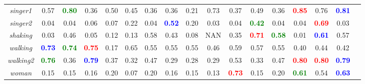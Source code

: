 \documentclass[preprint,12pt,review]{elsarticle}
\begin{document}
\begin{table*}[htp]
{\begin{tabular}{|c|c|c|c|c|c|c|c|c|c|c|c|c|c|c|c|c|}
%
\emph{singer1}   &0.57   &\textcolor{green}{\textbf{0.80}}  &0.36 &0.50  &0.45 &0.36 &0.36 &0.21 &0.73 &0.37 &0.49  &0.36  &\textcolor{red}{\textbf{0.85}}  &0.76 &\textcolor{blue}{\textbf{0.81}} \\
%
\emph{singer2}   &0.04  &0.04  &0.06  &0.07  &0.22 &0.04  &\textcolor{blue}{\textbf{0.52}}  &0.20  &0.03 &0.04 &\textcolor{green}{\textbf{0.42 }} &0.04  &0.04  &\textcolor{red}{\textbf{0.69}}  &0.03\\
%
\emph{shaking}   &0.03   &0.46  &0.05 &0.12  &0.13 &0.58  &0.43 &0.08  &NAN   &0.35   &\textcolor{red}{\textbf{0.71}}  &\textcolor{green}{\textbf{0.58}}  &0.01 &\textcolor{blue}{\textbf{0.61}} &0.57 \\
%
\emph{walking}   &\textcolor{blue}{\textbf{0.73}}   &\textcolor{green}{\textbf{0.74}}  &\textcolor{red}{\textbf{0.75}}   &0.17 &0.65 &0.55  &0.55  &0.55 &0.46 &0.59 &0.57 &0.55 &0.40 &0.44 &0.42 \\
%
\emph{walking2}  &\textcolor{green}{\textbf{0.76}}   &0.36  &\textcolor{blue}{\textbf{0.79}} &0.37  &0.32 &0.47 &0.29 &0.28  &0.29 &0.53 &0.33 &0.47 &\textcolor{red}{\textbf{0.80}} &\textcolor{red}{\textbf{0.80}} &\textcolor{blue}{\textbf{0.79}}\\
%
\emph{woman}  &0.15   &0.15  &0.16  &0.20  &0.07 &0.20  &0.16  &0.15  &0.13  &\textcolor{red}{\textbf{0.73}}  &0.15 &0.20  &\textcolor{green}{\textbf{0.61}} &0.54 &\textcolor{blue}{\textbf{0.63}} \\
%
\hline
\end{tabular}}
\label{tab:overlaprate}
\end{table*}
%
\end{document}

